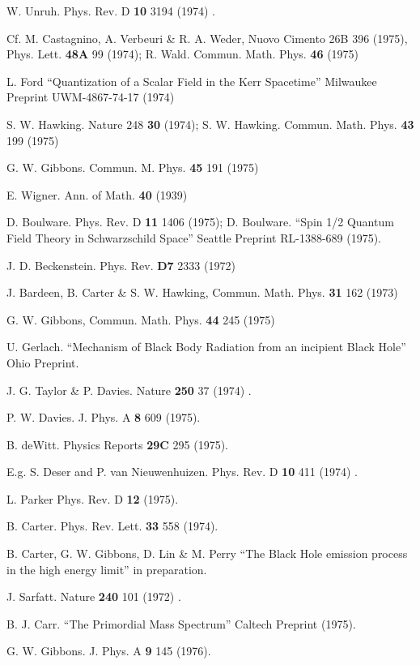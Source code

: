\begin{thebibliography}{100}
\bibitem[21]{} W. Unruh. Phys. Rev. D \textbf{10} 3194 (1974) .

\bibitem[22]{} Cf. M. Castagnino, A. Verbeuri \& R. A. Weder,
Nuovo Cimento 26B 396 (1975), Phys. Lett. \textbf{48A} 99 (1974);
R. Wald. Commun. Math. Phys. \textbf{46} (1975)

\bibitem[23]{} L. Ford ``Quantization of a Scalar Field in the Kerr Spacetime'' Milwaukee Preprint UWM-4867-74-17 (1974)

\bibitem[24]{} S. W. Hawking. Nature 248 \textbf{30} (1974); S. W. Hawking. Commun. Math. Phys.
\textbf{43} 199 (1975)

\bibitem[25]{} G. W. Gibbons. Commun. M. Phys. \textbf{45} 191 (1975)

\bibitem[26]{} E. Wigner. Ann. of Math. \textbf{40} (1939)

\bibitem[27]{} D. Boulware. Phys. Rev. D \textbf{11} 1406 (1975); D. Boulware. ``Spin 1/2 Quantum
Field Theory in Schwarzschild Space'' Seattle Preprint RL-1388-689 (1975).

\bibitem[28]{} J. D. Beckenstein. Phys. Rev. \textbf{D7} 2333 (1972)

\bibitem[29]{} J. Bardeen, B. Carter \& S. W. Hawking, Commun. Math. Phys. \textbf{31} 162 (1973)

\bibitem[30]{} G. W. Gibbons, Commun. Math. Phys. \textbf{44} 245 (1975)

\bibitem[31]{} U. Gerlach. ``Mechanism of Black Body Radiation from an incipient Black
Hole'' Ohio Preprint.

\bibitem[32]{} J. G. Taylor \& P. Davies. Nature \textbf{250} 37 (1974) .

\bibitem[33]{} P. W. Davies. J. Phys. A \textbf{8} 609 (1975).

\bibitem[34]{} B. deWitt. Physics Reports \textbf{29C} 295 (1975).

\bibitem[35]{} E.g. S. Deser and P. van Nieuwenhuizen. Phys. Rev. D \textbf{10} 411 (1974) .

\bibitem[36]{} L. Parker Phys. Rev. D \textbf{12} (1975).

\bibitem[37]{} B. Carter. Phys. Rev. Lett. \textbf{33} 558 (1974).

\bibitem[38]{} B. Carter, G. W. Gibbons, D. Lin \& M. Perry ``The Black Hole emission
process in the high energy limit'' in preparation.

\bibitem[39]{} J. Sarfatt. Nature \textbf{240} 101 (1972) .

\bibitem[40]{} B. J. Carr. ``The Primordial Mass Spectrum'' Caltech Preprint (1975).

\bibitem[41]{} G. W. Gibbons. J. Phys. A \textbf{9} 145 (1976).

\end{thebibliography}

